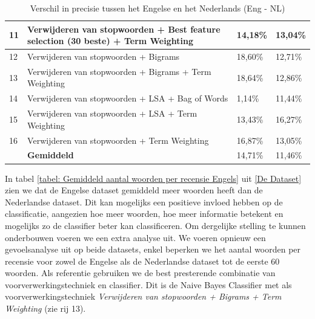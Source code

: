 \begin{table}[H]
\begin{adjustbox}{width=1\textwidth}
\begin{tabular}{|l|l|l|l|}
11       & Verwijderen van stopwoorden + Best feature selection (30 beste) + Term Weighting & 14,18\%                                & 13,04\%                                  \\ \hline
12       & Verwijderen van stopwoorden + Bigrams                                            & 18,60\%                                & 12,71\%                                  \\ \hline
13       & Verwijderen van stopwoorden + Bigrams + Term Weighting                           & 18,64\%                                & 12,86\%                                  \\ \hline
14       & Verwijderen van stopwoorden + LSA + Bag of Words                                 & 1,14\%                                 & 11,44\%                                  \\ \hline
15       & Verwijderen van stopwoorden + LSA + Term Weighting                               & 13,43\%                                & 16,27\%                                  \\ \hline
16       & Verwijderen van stopwoorden + Term Weighting                                     & 16,87\%                                & 13,05\%                                  \\ \hline
         & {\bf Gemiddeld}                                                                  & 14,71\%                                & 11,46\%                                  \\ \hline
\end{tabular}
\end{adjustbox}
\caption{Verschil in precisie tussen het Engelse en het Nederlands (Eng - NL)}
\label{tabel: verschil engels en nederlandse prestatie}
\end{table}

In tabel \ref{tabel: Gemiddeld aantal woorden per recensie Engels} uit \ref{De Dataset} zien we dat de Engelse dataset gemiddeld meer woorden heeft dan de Nederlandse dataset. Dit kan mogelijks een positieve invloed hebben op de classificatie, aangezien hoe meer woorden, hoe meer informatie betekent en mogelijks zo de classifier beter kan classificeren. Om dergelijke stelling te kunnen onderbouwen voeren we een extra analyse uit. We voeren opnieuw een gevoelsanalyse uit op beide datasets, enkel beperken we het aantal woorden per recensie voor zowel de Engelse als de Nederlandse dataset tot de eerste 60 woorden. Als referentie gebruiken we de best presterende combinatie van voorverwerkingstechniek en classifier. Dit is de Naive Bayes Classifier met als voorverwerkingstechniek \textit{Verwijderen van stopwoorden + Bigrams + Term Weighting} (zie rij 13).\\

